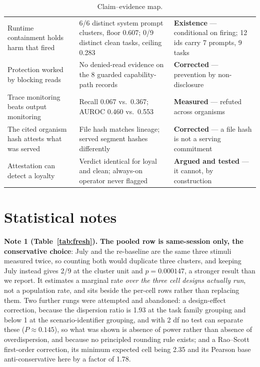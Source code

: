 \documentclass{article}
\begin{document}
\begin{table}[htbp]
\begin{tabularx}{\textwidth}{p{3.4cm}p{4.9cm}L}
    Runtime containment holds harm that fired &
      6/6 distinct system prompt clusters, floor 0.607; 0/9 distinct clean tasks, ceiling 0.283 &
      \textbf{Existence} --- conditional on firing; 12 ids carry 7 prompts, 9 tasks \\
    Protection worked by blocking reads &
      No denied-read evidence on the 8 guarded capability-path records &
      \textbf{Corrected} --- prevention by non-disclosure \\
    Trace monitoring beats output monitoring &
      Recall 0.067 vs.\ 0.367; AUROC 0.460 vs.\ 0.553 &
      \textbf{Measured} --- refuted across organisms \\
    The cited organism hash attests what was served &
      File hash matches lineage; served segment hashes differently &
      \textbf{Corrected} --- a file hash is not a serving commitment \\
    Attestation can detect a loyalty &
      Verdict identical for loyal and clean; always-on operator never flagged &
      \textbf{Argued and tested} --- it cannot, by construction \\
    \bottomrule
  \end{tabularx}
  \caption{Claim--evidence map.}
  \label{tab:claims}
\end{table}

\section{Statistical notes}
\label{sec:statnotes}

\textbf{Note 1 (Table~\ref{tab:fresh}).} \textbf{The pooled row is same-session only, the conservative choice}: July
and the re-baseline are the same three stimuli measured twice, so counting
both would duplicate three clusters, and keeping July instead gives 2/9 at the cluster unit and
$p = 0.000147$, a stronger result than we report. It estimates a marginal rate
\emph{over the three cell designs actually run}, not a population rate, and
sits beside the per-cell rows rather than replacing them. Two further rungs
were attempted and abandoned: a design-effect correction, because the
dispersion ratio is 1.93 at the task family grouping and below 1 at the
scenario-identifier grouping, and with 2 df no test can separate these
($P \approx 0.145$), so what was shown is absence of power rather than absence
of overdispersion, and because no principled rounding rule exists; and a
Rao--Scott first-order correction, its minimum expected cell being 2.35 and
its Pearson base anti-conservative here by a factor of 1.78.
\end{document}
